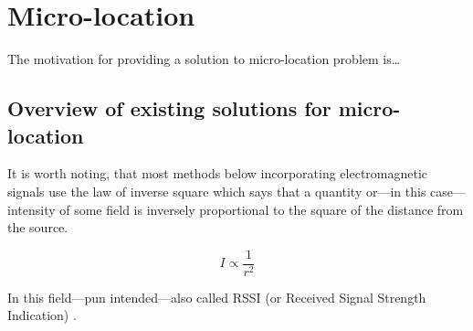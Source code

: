 \chapter{Micro-location}
\label{cha:motivation}


The motivation for providing a solution to micro-location problem is\ldots {}

\section{Overview of existing solutions for micro-location}
\label{sec:existing-uloc}

It is worth noting, that most methods below incorporating electromagnetic signals use the law of inverse square which says that a quantity or---in this case---intensity of some field is inversely proportional to the square of the distance from the source.

\begin{equation}
	\label{eq:inverse-sq}
	I \propto \frac{1}{r^2}
\end{equation}

In this field---pun intended---also called RSSI (or Received Signal Strength Indication) \cite{Gough:RSSI}.

